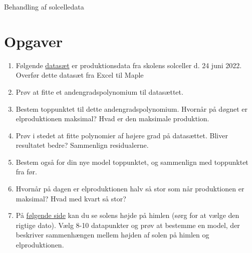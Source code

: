 \documentclass[12pt]{article}
\begin{document}


\begin{center}
\Huge
Behandling af solcelledata
\end{center}

\section*{Opgaver}

\begin{enumerate}[label=\roman*)]
	\item Følgende \href{https://github.com/ChristianJLex/TeachingNotes/raw/master/2022-2023/Data%20og%20lign/Solcelledata.xlsx}{\color{blue!60} datasæt} er produktionsdata fra skolens solceller d. 24 juni 2022. 
	Overfør dette datasæt fra Excel til Maple
	\item Prøv at fitte et andengradspolynomium til datasættet. 
	\item Bestem toppunktet til dette andengradspolynomium. Hvornår på døgnet er elproduktionen maksimal? Hvad er den maksimale produktion. 
	\item Prøv i stedet at fitte polynomier af højere grad på datasættet. Bliver resultatet bedre? Sammenlign residualerne. 
	\item Bestem også for din nye model toppunktet, og sammenlign med toppunktet fra før.
	\item Hvornår på dagen er elproduktionen halv så stor som når produktionen er maksimal? Hvad med kvart så stor?
	\item På \href{https://www.suninfo.dk/solhojde/solhojde.php}{\color{blue!60} følgende side} kan du se solens højde på himlen (sørg for at vælge den rigtige dato). Vælg 8-10 datapunkter og prøv at bestemme en model, der beskriver sammenhængen mellem
	højden af solen på himlen og	elproduktionen. 
\end{enumerate}
\end{document}
